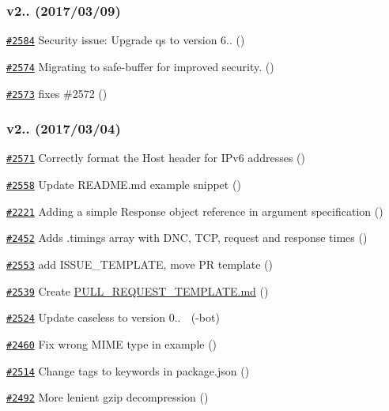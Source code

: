 \subsubsection*{v2.. (2017/03/09)}


\begin{DoxyItemize}
\item \href{https://github.com/request/request/pull/2584}{\tt \#2584} Security issue\+: Upgrade qs to version 6.. ()
\item \href{https://github.com/request/request/pull/2574}{\tt \#2574} Migrating to safe-\/buffer for improved security. ()
\item \href{https://github.com/request/request/pull/2573}{\tt \#2573} fixes \#2572 ()
\end{DoxyItemize}

\subsubsection*{v2.. (2017/03/04)}


\begin{DoxyItemize}
\item \href{https://github.com/request/request/pull/2571}{\tt \#2571} Correctly format the Host header for I\+Pv6 addresses ()
\item \href{https://github.com/request/request/pull/2558}{\tt \#2558} Update R\+E\+A\+D\+M\+E.\+md example snippet ()
\item \href{https://github.com/request/request/pull/2221}{\tt \#2221} Adding a simple Response object reference in argument specification ()
\item \href{https://github.com/request/request/pull/2452}{\tt \#2452} Adds .timings array with D\+NC, T\+CP, request and response times ()
\item \href{https://github.com/request/request/pull/2553}{\tt \#2553} add I\+S\+S\+U\+E\+\_\+\+T\+E\+M\+P\+L\+A\+TE, move PR template ()
\item \href{https://github.com/request/request/pull/2539}{\tt \#2539} Create \mbox{\hyperlink{_p_u_l_l___r_e_q_u_e_s_t___t_e_m_p_l_a_t_e_8md}{P\+U\+L\+L\+\_\+\+R\+E\+Q\+U\+E\+S\+T\+\_\+\+T\+E\+M\+P\+L\+A\+T\+E.\+md}} ()
\item \href{https://github.com/request/request/pull/2524}{\tt \#2524} Update caseless to version 0.. 🚀 (-\/bot)
\item \href{https://github.com/request/request/pull/2460}{\tt \#2460} Fix wrong M\+I\+ME type in example ()
\item \href{https://github.com/request/request/pull/2514}{\tt \#2514} Change tags to keywords in package.\+json ()
\item \href{https://github.com/request/request/pull/2492}{\tt \#2492} More lenient gzip decompression ()
\end{DoxyItemize}

